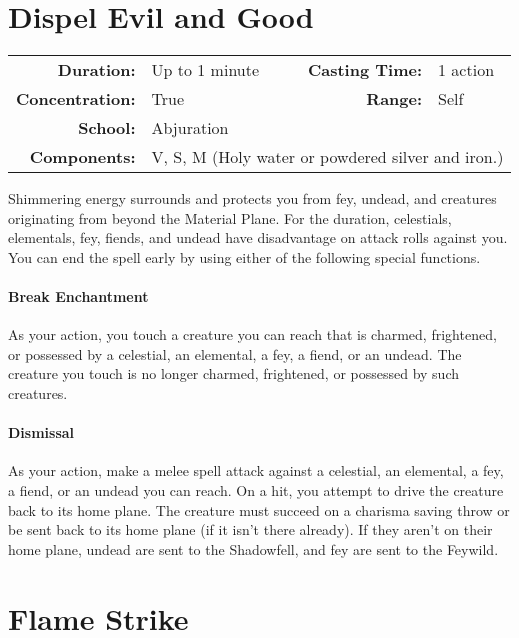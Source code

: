 \documentclass[a5paper, 12pt]{memoir}
\begin{document}
\newpage
\section*{Dispel Evil and Good}

{
\small\centering\vspace{-6pt}
\begin{tabular}{rlrl}
\toprule

\textbf{Duration:} & Up to 1 minute &
\textbf{Casting Time:} & 1 action \\
\textbf{Concentration:} & True &
\textbf{Range:} & Self \\
\textbf{School:} & Abjuration \\
\textbf{Components:} & \multicolumn{3}{p{0.7\textwidth}}{V, S, M (Holy water or powdered silver and iron.)}\\

\bottomrule
\end{tabular}
}

\vspace{1\baselineskip}\noindent Shimmering energy surrounds and protects you from fey, undead, and creatures originating from beyond the Material Plane. For the duration, celestials, elementals, fey, fiends, and undead have disadvantage on attack rolls against you. You can end the spell early by using either of the following special functions. \paragraph{Break Enchantment} As your action, you touch a creature you can reach that is charmed, frightened, or possessed by a celestial, an elemental, a fey, a fiend, or an undead. The creature you touch is no longer charmed, frightened, or possessed by such creatures. \paragraph{Dismissal} As your action, make a melee spell attack against a celestial, an elemental, a fey, a fiend, or an undead you can reach. On a hit, you attempt to drive the creature back to its home plane. The creature must succeed on a charisma saving throw or be sent back to its home plane (if it isn't there already). If they aren't on their home plane, undead are sent to the Shadowfell, and fey are sent to the Feywild.

\newpage
\section*{Flame Strike}
\end{document}
